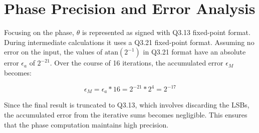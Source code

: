 \section{Phase Precision and Error Analysis}
Focusing on the phase, \( \theta \) is represented as signed with Q3.13 fixed-point format. During intermediate calculations it uses a Q3.21 fixed-point format. Assuming no error on the input, the values of \( \text{atan}(2^{-1}) \) in Q3.21 format have an absolute error \( \epsilon_a \) of \(2^{-21}\). Over the course of 16 iterations, the accumulated error \( \epsilon_M \) becomes:

\[
    \epsilon_M = \epsilon_a * 16 = 2^{-21} * 2^{4} = 2^{-17}
\]

Since the final result is truncated to Q3.13, which involves discarding the LSBs, the accumulated error from the iterative sums becomes negligible. This ensures that the phase computation maintains high precision.